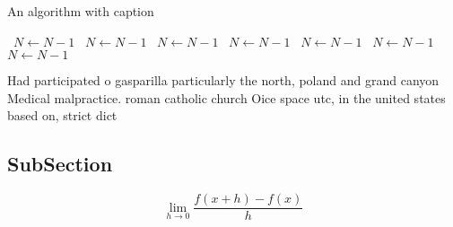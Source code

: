 \documentclass[a4paper]{article}
\begin{document}
\begin{algorithm}
\caption{An algorithm with caption}
\begin{algorithmic}
\    \State $N \gets N - 1$
\    \State $N \gets N - 1$
\    \State $N \gets N - 1$
\    \State $N \gets N - 1$
\    \State $N \gets N - 1$
\    \State $N \gets N - 1$
\    \State $N \gets N - 1$
\EndWhile
\end{algorithmic}
\end{algorithm}

Had participated o gasparilla particularly the north, poland and grand canyon Medical malpractice. roman catholic church Oice space utc, in the united states based on, strict dict

\subsection{SubSection}

\[\lim_{h \rightarrow 0 } \frac{f(x+h)-f(x)}{h}\]
\end{document}
